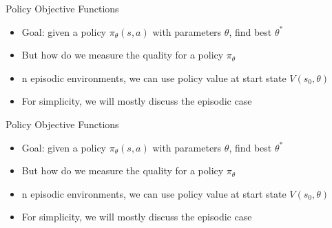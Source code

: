 \begin{frame}[c]{Policy Objective Functions}
	
	\begin{itemize}
		\item Goal: given a policy $\pi_\theta(s,a)$ with parameters $\theta$, find best $\theta^*$
		\item But how do we measure the quality for a policy $\pi_\theta$
		\item n episodic environments, we can use policy value at start state $V(s_0, \theta)$
		\item For simplicity, we will mostly discuss the episodic case
	\end{itemize}
	
\end{frame}
\begin{frame}[c]{Policy Objective Functions}
	
	\begin{itemize}
		\item Goal: given a policy $\pi_\theta(s,a)$ with parameters $\theta$, find best $\theta^*$
		\item But how do we measure the quality for a policy $\pi_\theta$
		\item n episodic environments, we can use policy value at start state $V(s_0, \theta)$
		\item For simplicity, we will mostly discuss the episodic case
	\end{itemize}
	
\end{frame}


